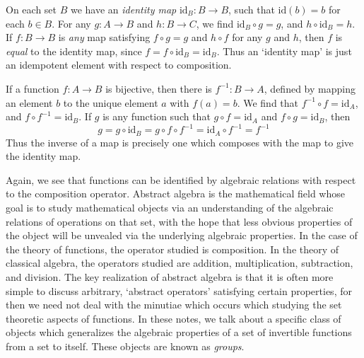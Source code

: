 \begin{example}
    On each set $B$ we have an \emph{identity map} $\text{id}_B: B \to B$, such that $\text{id}(b) = b$ for each $b \in B$. For any $g: A \to B$ and $h: B \to C$, we find $\text{id}_B \circ g = g$, and $h \circ \text{id}_B = h$. If $f: B \to B$ is {\it any} map satisfying $f \circ g = g$ and $h \circ f$ for any $g$ and $h$, then $f$ is {\it equal} to the identity map, since $f = f \circ \text{id}_B = \text{id}_B$. Thus an `identity map' is just an idempotent element with respect to composition.
\end{example}

\begin{example}
    If a function $f: A \to B$ is bijective, then there is $f^{-1}: B \to A$, defined by mapping an element $b$ to the unique element $a$ with $f(a) = b$. We find that $f^{-1} \circ f = \text{id}_A$, and $f \circ f^{-1} = \text{id}_B$. If $g$ is any function such that $g \circ f = \text{id}_A$ and $f \circ g = \text{id}_B$, then
    \[ g = g \circ \text{id}_B = g \circ f \circ f^{-1} = \text{id}_A \circ f^{-1} = f^{-1} \]
    Thus the inverse of a map is precisely one which composes with the map to give the identity map.
\end{example}

Again, we see that functions can be identified by algebraic relations with respect to the composition operator. Abstract algebra is the mathematical field whose goal is to study mathematical objects via an understanding of the algebraic relations of operations on that set, with the hope that less obvious properties of the object will be unvealed via the underlying algebraic properties. In the case of the theory of functions, the operator studied is composition. In the theory of classical algebra, the operators studied are addition, multiplication, subtraction, and division. The key realization of abstract algebra is that it is often more simple to discuss arbitrary, `abstract operators' satisfying certain properties, for then we need not deal with the minutiae which occurs which studying the set theoretic aspects of functions. In these notes, we talk about a specific class of objects which generalizes the algebraic properties of a set of invertible functions from a set to itself. These objects are known as \emph{groups}.

